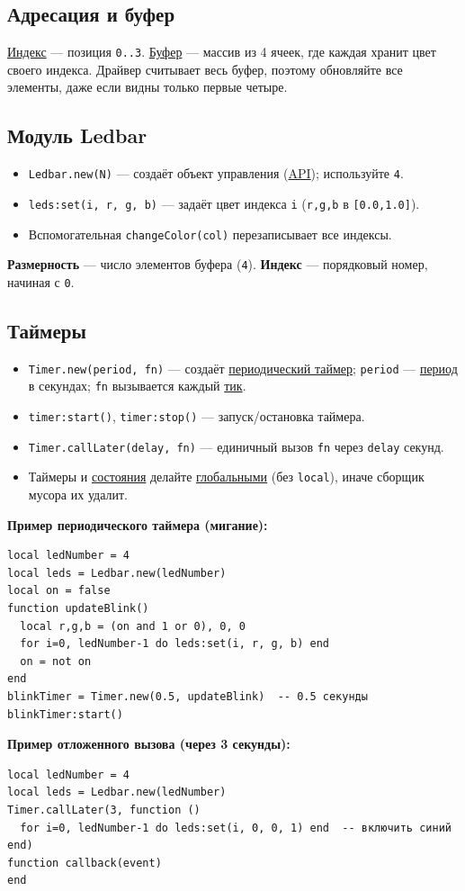 \documentclass[a4paper,12pt]{article}
\begin{document}
\subsection{Адресация и буфер}
\hyperlink{term:index}{Индекс} — позиция \verb|0..3|. \hyperlink{term:buffer}{Буфер} — массив из 4 ячеек, где каждая хранит цвет своего индекса. Драйвер считывает весь буфер, поэтому обновляйте все элементы, даже если видны только первые четыре.

\subsection{Модуль Ledbar}
\begin{itemize}
  \item \verb|Ledbar.new(N)| — создаёт объект управления (\hyperlink{term:api}{API}); используйте \verb|4|.
  \item \verb|leds:set(i, r, g, b)| — задаёт цвет индекса \verb|i| (\verb|r,g,b| в \verb|[0.0,1.0]|).
  \item Вспомогательная \verb|changeColor(col)| перезаписывает все индексы.
\end{itemize}
\textbf{Размерность} — число элементов буфера (\verb|4|). \textbf{Индекс} — порядковый номер, начиная с \verb|0|.

\subsection{Таймеры}
\begin{itemize}
  \item \verb|Timer.new(period, fn)| — создаёт \hyperlink{term:timer}{периодический таймер}; \verb|period| — \hyperlink{term:period}{период} в секундах; \verb|fn| вызывается каждый \hyperlink{term:tick}{тик}.
  \item \verb|timer:start()|, \verb|timer:stop()| — запуск/остановка таймера.
  \item \verb|Timer.callLater(delay, fn)| — единичный вызов \verb|fn| через \verb|delay| секунд.
  \item Таймеры и \hyperlink{term:state}{состояния} делайте \hyperlink{term:scope}{глобальными} (без \verb|local|), иначе сборщик мусора их удалит.
\end{itemize}
\textbf{Пример периодического таймера (мигание):}
\begin{lstlisting}[style=lua]
local ledNumber = 4
local leds = Ledbar.new(ledNumber)
local on = false
function updateBlink()
  local r,g,b = (on and 1 or 0), 0, 0
  for i=0, ledNumber-1 do leds:set(i, r, g, b) end
  on = not on
end
blinkTimer = Timer.new(0.5, updateBlink)  -- 0.5 секунды
blinkTimer:start()
\end{lstlisting}
\textbf{Пример отложенного вызова (через 3 секунды):}
\begin{lstlisting}[style=lua]
local ledNumber = 4
local leds = Ledbar.new(ledNumber)
Timer.callLater(3, function ()
  for i=0, ledNumber-1 do leds:set(i, 0, 0, 1) end  -- включить синий
end)
function callback(event)
end
\end{lstlisting}
\end{document}

